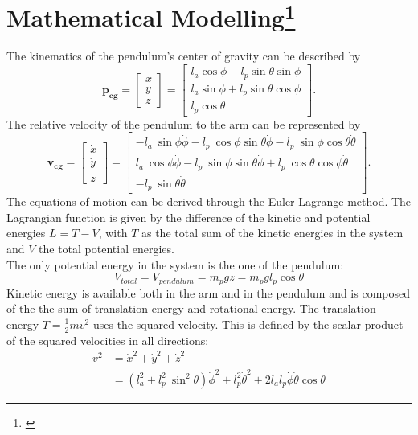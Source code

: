 \section{Mathematical 
Modelling\protect\footnote[1]{\cite{akhtaruzzaman2010modeling,furuta1992swing,gafvert2016modelling,
		ozbek2010swing,zhang2011optimal,fairus2013fuzzy}}} 
The kinematics of the pendulum's 
center of gravity can be described by 
\[\mathbf{p_{cg}}=\begin{bmatrix}
x	\\ 
y	\\ 
z	
	\end{bmatrix} =\begin{bmatrix}
l_a\cos\phi-l_{p}\sin\theta\sin\phi \\ 
l_a\sin\phi+l_{p}\sin\theta\cos\phi \\ 
l_{p}\cos\theta
\end{bmatrix}. \] 
The relative velocity of the pendulum to the arm can be represented by 
\[\mathbf{v_{cg}}= \begin{bmatrix}
\dot{x}\\
\dot{y}\\
\dot{z}\end{bmatrix}=\begin{bmatrix}
-l_a\ \sin \phi \dot{\phi}-l_{p}\ \cos\phi \sin\theta\dot{\phi}-l_{p} 
\ \sin\phi \cos\theta\dot{\theta} \\ 
l_a\ \cos\phi\dot{\phi}-l_{p} \ \sin\phi \sin\theta\dot{\phi}+l_{p} 
\ \cos\theta \cos\phi\dot{\theta} \\
-l_{p} \ \sin\theta\dot{\theta}
\end{bmatrix}.\]
The equations of motion can be derived through the Euler-Lagrange 
method. The Lagrangian function is given by the difference of the 
kinetic and potential energies $L=T-V$, with $T$ as the total sum of the 
kinetic energies in the system and $V$ the total potential energies.\\
The only potential energy in the system is the one of the pendulum:
\[V_{total}=V_{pendulum}=m_pgz= m_pgl_{p}\cos\theta\]
Kinetic energy is available both in the arm and in the pendulum and is composed 
of the the sum of translation energy and rotational energy. The translation 
energy $T=\frac{1}{2}mv^2$ uses the squared velocity. This is defined by  the 
scalar product 
of the squared velocities in all directions:
\begin{align*}v^2&=\dot{x}^2+\dot{y}^2+\dot{z}^2\\
&=(l_a^2+l_p^2\ 
\sin^2\theta)\dot{\phi}^2+l_p^2\dot{\theta}^2+2l_al_p\dot{\phi}\dot{\theta}\cos 
\theta\end{align*} 
